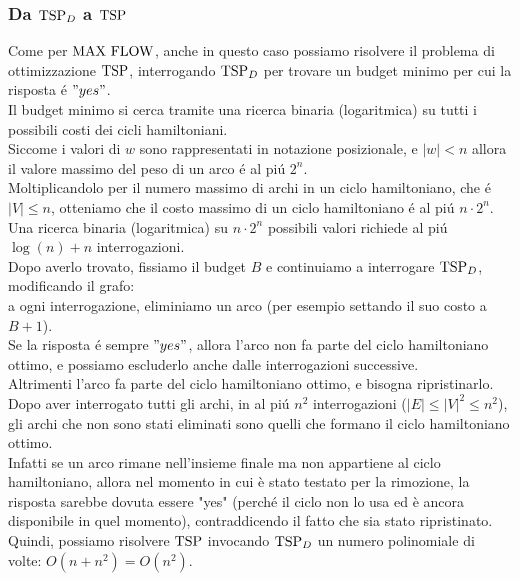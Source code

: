 \subsubsection{Da $\text{TSP}_D$ a $\text{TSP}$}
Come per $\text{MAX FLOW}$, anche in questo caso possiamo risolvere il problema di ottimizzazione $\text{TSP}$,
interrogando $\text{TSP}_D$ per trovare un budget minimo per cui la risposta é $"yes"$. \\
Il budget minimo si cerca tramite una ricerca binaria (logaritmica) su tutti i possibili costi dei cicli hamiltoniani. \\

Siccome i valori di $w$ sono rappresentati in notazione posizionale, e $|w| < n$ allora il valore massimo
del peso di un arco é al piú $2^n$. \\
Moltiplicandolo per il numero massimo di archi in un ciclo hamiltoniano, che é $|V| \leq n$,
otteniamo che il costo massimo di un ciclo hamiltoniano é al piú $n \cdot 2^n$. \\
Una ricerca binaria (logaritmica) su $n \cdot 2^n$ possibili valori richiede al piú $\log(n) + n$ interrogazioni. \\

Dopo averlo trovato, fissiamo il budget $B$ e continuiamo a interrogare $\text{TSP}_D$, modificando il grafo: \\ 
a ogni interrogazione, eliminiamo un arco (per esempio settando il suo costo a $B + 1$). \\
Se la risposta é sempre $"yes"$, allora l'arco non fa parte del ciclo hamiltoniano ottimo, e possiamo escluderlo anche dalle interrogazioni successive. \\
Altrimenti l'arco fa parte del ciclo hamiltoniano ottimo, e bisogna ripristinarlo. \\

Dopo aver interrogato tutti gli archi, in al piú $n^2$ interrogazioni ($|E| \leq |V|^2 \leq n^2$), 
gli archi che non sono stati eliminati sono quelli che formano il ciclo hamiltoniano ottimo. \\
Infatti se un arco rimane nell'insieme finale  ma non appartiene al ciclo hamiltoniano, 
allora nel momento in cui è stato testato per la rimozione, la risposta sarebbe dovuta essere "yes" 
(perché il ciclo non lo usa ed è ancora disponibile in quel momento), contraddicendo il fatto che 
sia stato ripristinato. \\

Quindi, possiamo risolvere $\text{TSP}$ invocando $\text{TSP}_D$ un numero polinomiale di volte: $O(n + n^2) = O(n^2)$.

